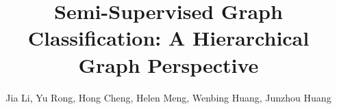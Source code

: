 \documentclass[sigconf]{acmart}
\newcommand{\eat}[1]{}
\begin{document}
\title{Semi-Supervised Graph Classification: A Hierarchical Graph Perspective}





\eat{
\author{Jia Li}
\affiliation{\department{Department of Systems Engineering and Engineering  Management}
  \institution{The Chinese University of Hong Kong}
  \institution{Tencent AI Lab}
}
\email{lijia@se.cuhk.edu.hk}

\author{Yu Rong}
\affiliation{\institution{Tencent AI Lab}
  \city{Shenzhen}
}
\email{yu.rong@hotmail.com}

\author{Hong Cheng}
\affiliation{\department{Department of Systems Engineering and Engineering  Management}
  \institution{The Chinese University of Hong Kong}
}
\email{hcheng@se.cuhk.edu.hk}


\author{Helen Meng}
\affiliation{\department{Department of Systems Engineering and Engineering  Management}
  \institution{The Chinese University of Hong Kong}
}
\email{hmmeng@se.cuhk.edu.hk}


\author{Wenbing Huang}
\affiliation{\institution{Tencent AI Lab}
  \city{Shenzhen}
}
\email{hwenbing@126.com}

\author{Junzhou Huang}
\affiliation{\institution{Tencent AI Lab}
  \city{Shenzhen}
}
\email{joehhuang@tencent.com}
}


\author{Jia Li, Yu Rong, Hong Cheng, Helen Meng, Wenbing Huang, Junzhou Huang}

\renewcommand{\shortauthors}{J. Li et al.}
\end{document}
